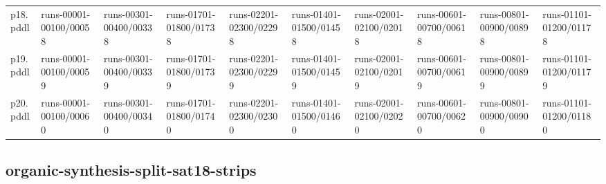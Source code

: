 \documentclass{article}
\begin{document}
\begin{tabular}{@{}lrrrrrrrrr@{}}
p18.pddl & \multicolumn{1}{|l|}{runs-00001-00100/00058} & \multicolumn{1}{|l|}{runs-00301-00400/00338} & \multicolumn{1}{|l|}{runs-01701-01800/01738} & \multicolumn{1}{|l|}{runs-02201-02300/02298} & \multicolumn{1}{|l|}{runs-01401-01500/01458} & \multicolumn{1}{|l|}{runs-02001-02100/02018} & \multicolumn{1}{|l|}{runs-00601-00700/00618} & \multicolumn{1}{|l|}{runs-00801-00900/00898} & \multicolumn{1}{|l|}{runs-01101-01200/01178} \\
p19.pddl & \multicolumn{1}{|l|}{runs-00001-00100/00059} & \multicolumn{1}{|l|}{runs-00301-00400/00339} & \multicolumn{1}{|l|}{runs-01701-01800/01739} & \multicolumn{1}{|l|}{runs-02201-02300/02299} & \multicolumn{1}{|l|}{runs-01401-01500/01459} & \multicolumn{1}{|l|}{runs-02001-02100/02019} & \multicolumn{1}{|l|}{runs-00601-00700/00619} & \multicolumn{1}{|l|}{runs-00801-00900/00899} & \multicolumn{1}{|l|}{runs-01101-01200/01179} \\
p20.pddl & \multicolumn{1}{|l|}{runs-00001-00100/00060} & \multicolumn{1}{|l|}{runs-00301-00400/00340} & \multicolumn{1}{|l|}{runs-01701-01800/01740} & \multicolumn{1}{|l|}{runs-02201-02300/02300} & \multicolumn{1}{|l|}{runs-01401-01500/01460} & \multicolumn{1}{|l|}{runs-02001-02100/02020} & \multicolumn{1}{|l|}{runs-00601-00700/00620} & \multicolumn{1}{|l|}{runs-00801-00900/00900} & \multicolumn{1}{|l|}{runs-01101-01200/01180} \\
\end{tabular}

\hypertarget{run_dir-organic-synthesis-split-sat18-strips}{}
\subsection*{organic-synthesis-split-sat18-strips}
\end{document}
